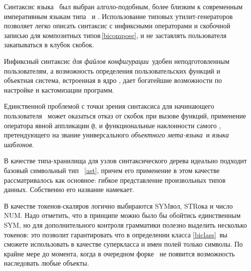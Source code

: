 \secdown

Синтаксис языка \bi\ был выбран алголо-подобным, более близким к современным
императивным языкам типа \cpp\ и \py. Использование типовых утилит-генераторов
позволяет легко описать синтаксис с инфиксными операторами и скобочной записью
для композитных типов\,\ref{bicompose}, и не заставлять пользователя
закапываться в клубок  скобок.

Инфиксный синтаксис \emph{для файлов конфигурации}\ удобен неподготовленным
пользователям, а возможность определения пользовательских функций и объектная
система, встроенная в ядро \bi, дает богатейшие возможности по настройке
и кастомизации программ.

Единственной проблемой с точки зрения синтаксиса для начинающего пользователя
\bi\ может оказаться отказ от скобок при вызове функций, применение оператора
явной аппликации \verb|@|, и функциональные наклонности самого \bi,
претендующего на звание универсального \emph{объектного мета-языка}\ и
\emph{языка шаблонов}.

\label{bilexer}


\label{biparser}


В качестве типа-хранилища для узлов синтаксического дерева идеально подходит
базовый символьный тип \bi\ \ref{ast}, причем его применение в этом качестве
рассматривалось как основное: гибкое представление произвольных типов данных.
Собственно его название намекает.

В качестве токенов-скаляров логично выбираются SYMвол, STRока и число
NUM. Надо
отметить, что в принципе можно было бы обойтись единственным SYM, но для
дополнительного контроля грамматики полезно выделить несколько токенов: это
позволит гарантировать что в определении класса \ref{biclass}\ вы сможете
использовать в качестве суперкласса и имен полей только символы. По крайне мере
до момента, когда в очередном форке \bi\ не появится возможность наследовать
любые объекты.

\secup
